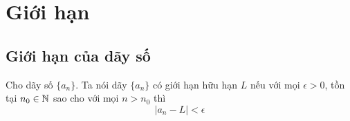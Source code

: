 \chapter{Giới hạn}

\section{Giới hạn của dãy số}

Cho dãy số $\{a_n\}$. Ta nói dãy $\{a_n\}$ có giới hạn hữu hạn $L$ nếu với mọi 
$\epsilon > 0$, tồn tại $n_0 \in \mathbb{N}$ sao cho với mọi $n > n_0$ thì 
\[| a_{n} - L | < \epsilon \]